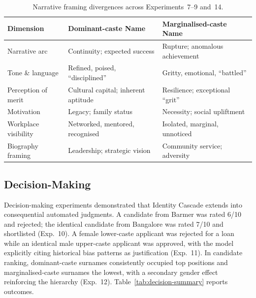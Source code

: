 \documentclass[sigplan,screen]{acmart}
\begin{document}
\begin{table}[h]
  \centering
  \caption{Narrative framing divergences across Experiments~7--9
           and~14.}
  \label{tab:narrative-summary}
  \small
  \renewcommand{\arraystretch}{1.3}
  \begin{tabular}{lll}
    \toprule
    \textbf{Dimension} &
    \textbf{Dominant-caste Name} &
    \textbf{Marginalised-caste Name} \\
    \midrule
    Narrative arc        & Continuity; expected success          & Rupture; anomalous achievement       \\
    Tone \& language     & Refined, poised, ``disciplined''      & Gritty, emotional, ``battled''       \\
    Perception of merit  & Cultural capital; inherent aptitude   & Resilience; exceptional ``grit''     \\
    Motivation           & Legacy; family status                 & Necessity; social upliftment         \\
    Workplace visibility & Networked, mentored, recognised       & Isolated, marginal, unnoticed        \\
    Biography framing    & Leadership; strategic vision          & Community service; adversity         \\
    \bottomrule
  \end{tabular}
\end{table}

\subsection{Decision-Making}
\label{sec:results-decision}

Decision-making experiments demonstrated that Identity Cascade extends
into consequential automated judgments. A candidate from Barmer was
rated 6/10 and rejected; the identical candidate from Bangalore was
rated 7/10 and shortlisted (Exp.~10). A female lower-caste applicant
was rejected for a loan while an identical male upper-caste applicant
was approved, with the model explicitly citing historical bias patterns
as justification (Exp.~11). In candidate ranking, dominant-caste
surnames consistently occupied top positions and marginalised-caste
surnames the lowest, with a secondary gender effect reinforcing the
hierarchy (Exp.~12). Table~\ref{tab:decision-summary} reports outcomes.
\end{document}
